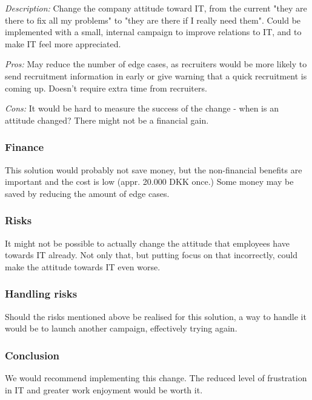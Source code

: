 \emph{Description:} Change the company attitude toward IT, from the current "they are there to fix all my problems" to "they are there if I really need them".
Could be implemented with a small, internal campaign to improve relations to IT, and to make IT feel more appreciated.

\emph{Pros:} May reduce the number of edge cases, as recruiters would be more likely to send recruitment information in early or give warning that a quick recruitment is coming up.
Doesn't require extra time from recruiters.

\emph{Cons:} It would be hard to measure the success of the change - when is an attitude changed?
There might not be a financial gain.

\subsubsection{Finance} 
This solution would probably not save money, but the non-financial benefits are important and the cost is low (appr. 20.000 DKK once.)
Some money may be saved by reducing the amount of edge cases.

\subsubsection{Risks}
It might not be possible to actually change the attitude that employees have towards IT already. Not only that, but putting focus on that incorrectly, could make the attitude towards IT even worse.

\subsubsection{Handling risks}
Should the risks mentioned above be realised for this solution, a way to handle it would be to launch another campaign, effectively trying again. 

\subsubsection{Conclusion} 
We would recommend implementing this change. 
The reduced level of frustration in IT and greater work enjoyment would be worth it.